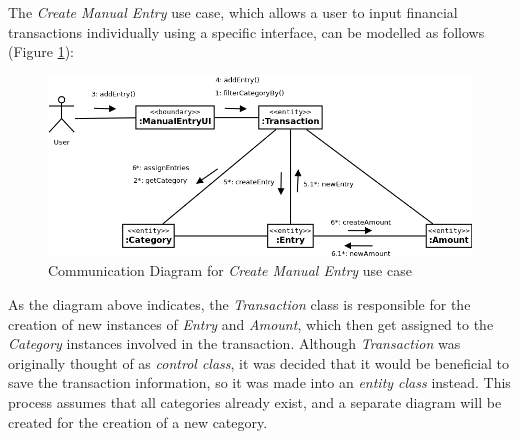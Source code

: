 The \emph{Create Manual Entry} use case, which allows a
user to input financial transactions individually using a specific interface,
can be modelled as follows (Figure \ref{fig:CommDiagram.CreateManualEntry}):
\begin{figure}[ht!]
  \begin{center}
    \includegraphics[width=16cm]{./contents/img/Comm_Diagram_-_Manual_Entry.png}
  \end{center}
  \caption{Communication Diagram for \emph{Create Manual Entry} use case}
  \label{fig:CommDiagram.CreateManualEntry}
\end{figure}
\FloatBarrier

As the diagram above indicates, the \emph{Transaction} class is responsible for
the creation of new instances of \emph{Entry} and \emph{Amount}, which then get
assigned to the \emph{Category} instances involved in the transaction. Although
\emph{Transaction} was originally thought of as \emph{control class}, it was
decided that it would be beneficial to save the transaction information, so it
was made into an \emph{entity class} instead. This process assumes that all
categories already exist, and a separate diagram will be created for the
creation of a new category.
